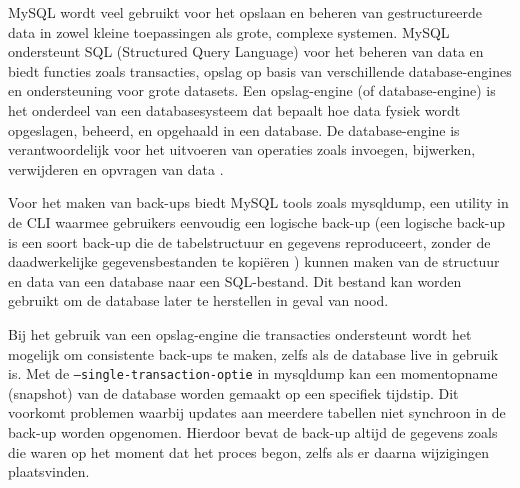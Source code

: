 MySQL wordt veel gebruikt voor het opslaan en beheren van gestructureerde data in zowel kleine toepassingen als grote, complexe systemen. MySQL ondersteunt SQL (Structured Query Language) voor het beheren van data en biedt functies zoals transacties, opslag op basis van verschillende database-engines en ondersteuning voor grote datasets. Een opslag-engine (of database-engine) is het onderdeel van een databasesysteem dat bepaalt hoe data fysiek wordt opgeslagen, beheerd, en opgehaald in een database. De database-engine is verantwoordelijk voor het uitvoeren van operaties zoals invoegen, bijwerken, verwijderen en opvragen van data \autocite{Cabral2011}.

Voor het maken van back-ups biedt MySQL tools zoals mysqldump, een utility in de CLI waarmee gebruikers eenvoudig een logische back-up (een logische back-up is een soort back-up die de tabelstructuur en gegevens reproduceert, zonder de daadwerkelijke gegevensbestanden te kopiëren \autocite{MySQL}) kunnen maken van de structuur en data van een database naar een SQL-bestand. Dit bestand kan worden gebruikt om de database later te herstellen in geval van nood. 

Bij het gebruik van een opslag-engine die transacties ondersteunt wordt het mogelijk om consistente back-ups te maken, zelfs als de database live in gebruik is. Met de \texttt{--single-transaction-optie} in mysqldump kan een momentopname (snapshot) van de database worden gemaakt op een specifiek tijdstip. Dit voorkomt problemen waarbij updates aan meerdere tabellen niet synchroon in de back-up worden opgenomen. Hierdoor bevat de back-up altijd de gegevens zoals die waren op het moment dat het proces begon, zelfs als er daarna wijzigingen plaatsvinden.















